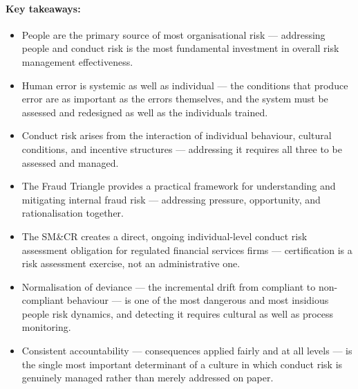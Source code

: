 \paragraph{Key takeaways:}
\begin{itemize}
  \item{People are the primary source of most organisational risk — addressing people and conduct risk is the most fundamental investment in overall risk management effectiveness.}
  \item{Human error is systemic as well as individual — the conditions that produce error are as important as the errors themselves, and the system must be assessed and redesigned as well as the individuals trained.}
  \item{Conduct risk arises from the interaction of individual behaviour, cultural conditions, and incentive structures — addressing it requires all three to be assessed and managed.}
  \item{The Fraud Triangle provides a practical framework for understanding and mitigating internal fraud risk — addressing pressure, opportunity, and rationalisation together.}
  \item{The SM\&CR creates a direct, ongoing individual-level conduct risk assessment obligation for regulated financial services firms — certification is a risk assessment exercise, not an administrative one.}
  \item{Normalisation of deviance — the incremental drift from compliant to non-compliant behaviour — is one of the most dangerous and most insidious people risk dynamics, and detecting it requires cultural as well as process monitoring.}
  \item{Consistent accountability — consequences applied fairly and at all levels — is the single most important determinant of a culture in which conduct risk is genuinely managed rather than merely addressed on paper.}
\end{itemize}

